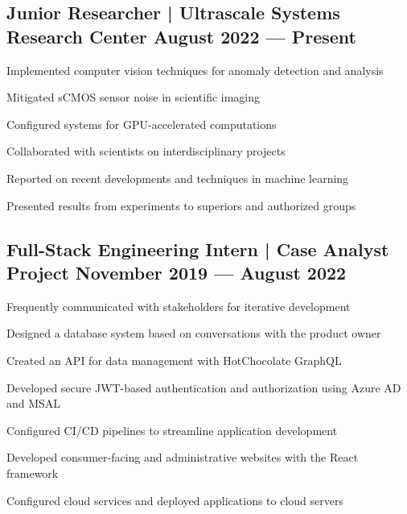 \subsection{{Junior Researcher | Ultrascale Systems Research Center \hfill August 2022 --- Present}}
\begin{zitemize}
\item Implemented computer vision techniques for anomaly detection and analysis
\item Mitigated sCMOS sensor noise in scientific imaging
\item Configured systems for GPU-accelerated computations
\item Collaborated with scientists on interdisciplinary projects
\item Reported on recent developments and techniques in machine learning
\item Presented results from experiments to superiors and authorized groups
\end{zitemize}

\subsection{{Full-Stack Engineering Intern | Case Analyst Project \hfill November 2019 --- August 2022}}
\begin{zitemize}
\item Frequently communicated with stakeholders for iterative development
\item Designed a database system based on conversations with the product owner
\item Created an API for data management with HotChocolate GraphQL
\item Developed secure JWT-based authentication and authorization using Azure AD and MSAL
\item Configured CI/CD pipelines to streamline application development
\item Developed consumer-facing and administrative websites with the React framework
\item Configured cloud services and deployed applications to cloud servers



\end{zitemize}

